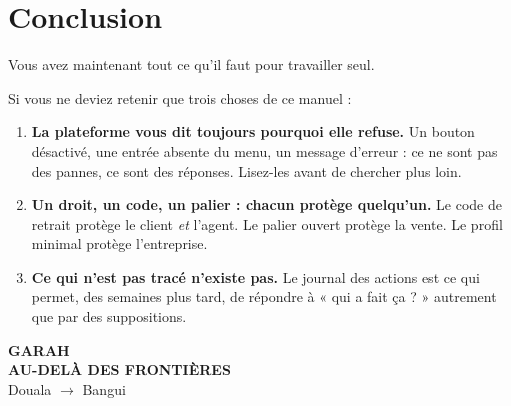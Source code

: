 \documentclass[11pt,a4paper]{report}
\begin{document}
\chapter*{Conclusion}

Vous avez maintenant tout ce qu'il faut pour travailler seul.

Si vous ne deviez retenir que trois choses de ce manuel :

\begin{enumerate}[leftmargin=*,itemsep=6pt]
  \item \textbf{La plateforme vous dit toujours pourquoi elle refuse.} Un
        bouton désactivé, une entrée absente du menu, un message d'erreur : ce
        ne sont pas des pannes, ce sont des réponses. Lisez-les avant de
        chercher plus loin.
  \item \textbf{Un droit, un code, un palier : chacun protège quelqu'un.} Le
        code de retrait protège le client \emph{et} l'agent. Le palier ouvert
        protège la vente. Le profil minimal protège l'entreprise.
  \item \textbf{Ce qui n'est pas tracé n'existe pas.} Le journal des actions est
        ce qui permet, des semaines plus tard, de répondre à « qui a fait ça ? »
        autrement que par des suppositions.
\end{enumerate}

\vfill
\begin{center}
\begin{tcolorbox}[width=0.8\linewidth,colback=garahFond,colframe=garahMarque,
  arc=5pt,boxrule=1.2pt]
\centering
{\Large\bfseries\color{garahEncre}%
 G\textcolor{garahMarque}{AR}\textcolor{garahAccent}{AH}}\\[3pt]
{\small\bfseries\color{garahSlogan}\MakeUppercase{Au-delà des frontières}}\\[8pt]
\footnotesize Douala $\rightarrow$ Bangui
\end{tcolorbox}
\end{center}
\vfill
\end{document}
